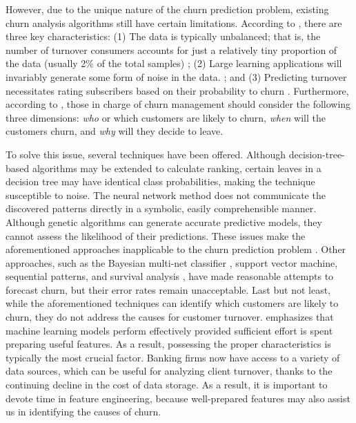However, due to the unique nature of the churn prediction problem,
existing churn analysis algorithms still have certain limitations.
According to \citet{Xie2009}, there are three key characteristics: (1)
The data is typically unbalanced; that is, the number of turnover
consumers accounts for just a relatively tiny proportion of the data
(usually 2\% of the total samples) \citep{Zhao2005}; (2) Large learning
applications will invariably generate some form of noise in the data.
\citep{Shah1996}; and (3) Predicting turnover necessitates rating
subscribers based on their probability to churn \citep{Au2003}.
Furthermore, according to \citet{Jan2019}, those in charge of churn
management should consider the following three dimensions: \emph{who} or
which customers are likely to churn, \emph{when} will the customers
churn, and \emph{why} will they decide to leave.

To solve this issue, several techniques have been offered. Although
decision-tree-based algorithms may be extended to calculate ranking,
certain leaves in a decision tree may have identical class
probabilities, making the technique susceptible to noise. The neural
network method does not communicate the discovered patterns directly in
a symbolic, easily comprehensible manner. Although genetic algorithms
can generate accurate predictive models, they cannot assess the
likelihood of their predictions. These issues make the aforementioned
approaches inapplicable to the churn prediction problem \citep{Au2003}.
Other approaches, such as the Bayesian multi-net classifier
\citep{Luo2004}, support vector machine, sequential patterns, and
survival analysis \citep{Lariviere2004}, have made reasonable attempts
to forecast churn, but their error rates remain unacceptable. Last but
not least, while the aforementioned techniques can identify which
customers are likely to churn, they do not address the causes for
customer turnover. \citet{Dahiya2015} emphasizes that machine learning
models perform effectively provided sufficient effort is spent preparing
useful features. As a result, possessing the proper characteristics is
typically the most crucial factor. Banking firms now have access to a
variety of data sources, which can be useful for analyzing client
turnover, thanks to the continuing decline in the cost of data storage.
As a result, it is important to devote time in feature engineering,
because well-prepared features may also assist us in identifying the
causes of churn.

